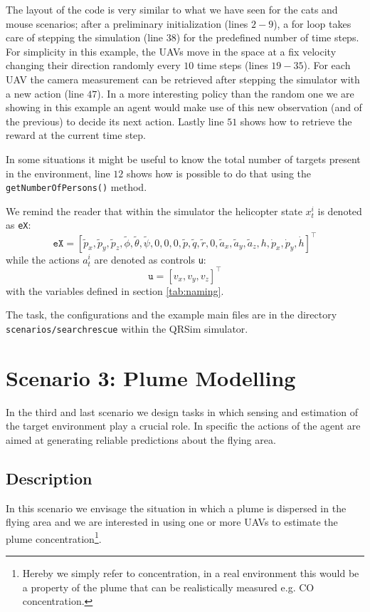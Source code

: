 \documentclass[a4paper,11pt]{report}
\newcommand{\sname}{QRSim\xspace}
\newcommand\mytexttt[1]{\texttt{\hyphenchar\font=45\relax #1}}
\begin{document}
The layout of the code is very similar to what we have seen for the cats and mouse scenarios; after a preliminary initialization (lines $2-9$), a for loop takes care of stepping the simulation (line $38$) for the predefined number of time steps.
For simplicity in this example, the UAVs move in the space at a fix velocity changing their direction randomly every $10$ time steps (lines $19-35$).
For each UAV the camera measurement can be retrieved after stepping the simulator with a new action (line $47$). In a more interesting policy than the random one we are showing in this example an agent would make use of this new observation (and of the previous) to decide its next action.
Lastly line $51$ shows how to retrieve the reward at the current time step. 

In some situations it might be useful to know the total number of targets present in the environment, line $12$ shows how is possible to do that using the \texttt{getNumberOfPersons()} method.
 
We remind the reader that within the simulator the helicopter state $x^i_t$ is denoted as \texttt{eX}:
$$\texttt{eX} = [\tilde{p}_x,\tilde{p}_y,\tilde{p}_z,\tilde{\phi},\tilde{\theta},\tilde{\psi},0,0,0,\tilde{p},\tilde{q},\tilde{r},0,\tilde{a}_x,\tilde{a}_y,\tilde{a}_z,h,\dot{p}_x,\dot{p}_y,\dot{h}]^\intercal$$
while the actions $a^i_t$ are denoted as controls \texttt{u}:
$$\texttt{u}=[v_x,v_y,v_z]^\intercal$$
with the variables defined in section \ref{tab:naming}.

The task, the configurations and the example main files are in the directory \mytexttt{scenarios/searchrescue} within the \sname simulator.

\newpage
\section{Scenario 3: Plume Modelling}\label{plumemodelling}
In the third and last scenario we design tasks in which sensing and estimation of the target environment play a crucial role. In specific the actions of the agent are aimed at generating reliable predictions about the flying area.  

\subsection{Description}

In this scenario we envisage the situation in which a plume is dispersed in the flying area and we are interested in using one or more UAVs to estimate the plume concentration\footnote{Hereby we simply refer to concentration, in a real environment this would be a property of the plume that can be realistically measured e.g. CO concentration.}.
\end{document}
